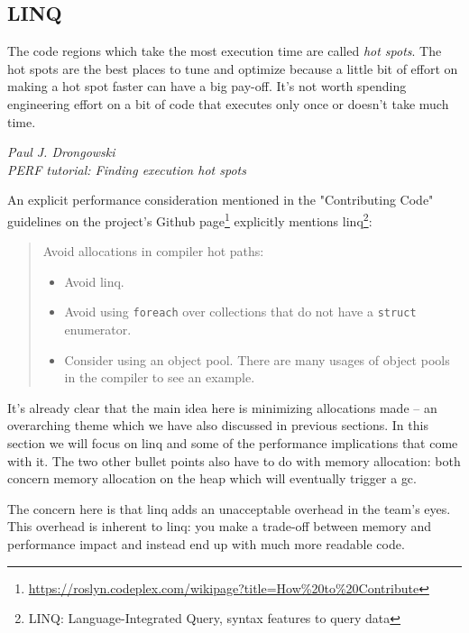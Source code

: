 \subsection{LINQ}
\label{sec:linq}

\epigraph{The code regions which take the most execution time are called \textit{hot spots}. The hot spots are the best places to tune and optimize because a little bit of effort on making a hot spot faster can have a big pay-off. It’s not worth spending engineering effort on a bit of code that executes only once or doesn’t take much time.}
{\textit{Paul J. Drongowski \\ \footnotesize{PERF tutorial: Finding execution hot spots\protect\footnotemark}}}


An explicit performance consideration mentioned in the "Contributing Code" guidelines on the project's Github page\footnote{\url{https://roslyn.codeplex.com/wikipage?title=How\%20to\%20Contribute}} explicitly mentions \gls{linq}\footnote{LINQ: Language-Integrated Query, syntax features to query data}:

\begin{quote}
Avoid allocations in \gls{compiler} hot paths:
\begin{itemize}
\item Avoid \gls{linq}.
\item Avoid using \texttt{foreach} over collections that do not have a \texttt{struct} enumerator.
\item Consider using an object pool. There are many usages of object pools in the \gls{compiler} to see an example.
\end{itemize}
\end{quote}

It's already clear that the main idea here is minimizing allocations made -- an overarching theme which we have also discussed in previous sections. In this section we will focus on \gls{linq} and some of the performance implications that come with it. The two other bullet points also have to do with memory allocation: both concern memory allocation on the heap which will eventually trigger a \gls{gc}.

The concern here is that \gls{linq} adds an unacceptable overhead in the team's eyes. This overhead is inherent to \gls{linq}: you make a trade-off between memory and performance impact and instead end up with much more readable code. 

